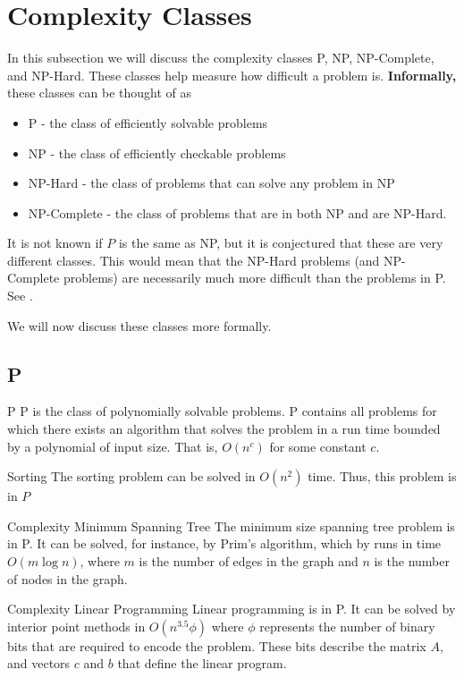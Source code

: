 \section{Complexity Classes}
In this subsection we will discuss the complexity classes P, NP, NP-Complete, and NP-Hard.  These classes help measure how difficult a problem is.  \textbf{Informally,} these classes can be thought of as 
\begin{itemize}
\item P - the class of efficiently solvable problems
\item NP - the class of efficiently checkable problems
\item NP-Hard - the class of problems that can solve any problem in NP
\item NP-Complete - the class of problems that are in both NP and are NP-Hard.
\end{itemize}
It is not known if $P$ is the same as NP, but it is conjectured that these are very different classes.  This would mean that the NP-Hard problems (and NP-Complete problems) are necessarily much more difficult than the problems in P.  See .

We will now discuss these classes more formally.
\subsection{P}
\begin{definition}{P}{}
P is the class of polynomially solvable problems.  P contains all problems for which there exists an algorithm that solves the problem in a run time bounded by a polynomial of input size. That is, $O(n^c)$ for some constant $c$.
\end{definition}

\begin{example}{Sorting}{}
The sorting problem can be solved in $O(n^2)$ time.  Thus, this problem is in $P$
\end{example}

\begin{example}{Complexity Minimum Spanning Tree}{}
The minimum size spanning tree problem is in P.  It can be solved, for instance, by Prim's algorithm, which  by runs in time $O(m \log n)$, where $m$ is the number of edges in the graph and $n$ is the number of nodes in the graph.  
\end{example}
\begin{example}{Complexity Linear Programming}{}
Linear programming is in P.  It can be solved by interior point methods in $O(n^{3.5} \phi)$ where $\phi$ represents the number of binary bits that are required to encode the problem.  These bits describe the matrix $A$, and vectors $c$ and $b$ that define the linear program.
\end{example}
